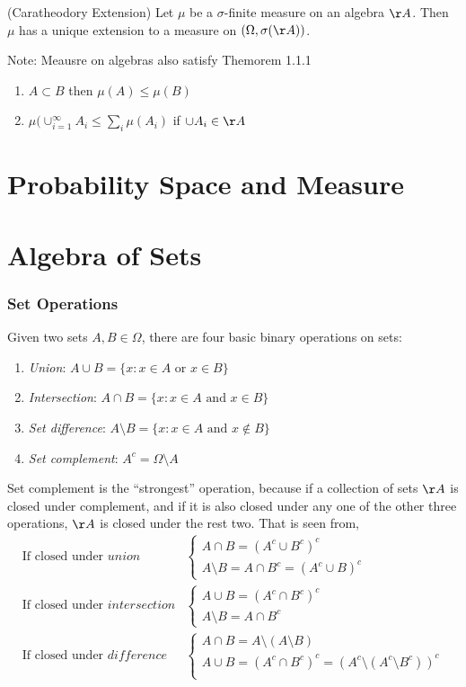 \begin{thm}
	(Caratheodory Extension) Let $\mu$ be a $\sigma$-finite measure on an algebra $\AA$. Then $\mu$ has a unique extension to a measure on $(\Omega, \sigma(\AA))$.
\end{thm}

Note: Meausre on algebras also satisfy Themorem 1.1.1
\begin{enumerate}
	\item $A \subset B$ then $\mu(A) \le \mu(B)$
	\item $\mu(\cup_{i=1}^\infty A_i \le \sum_i \mu(A_i)$ if $\cup A_i \in \AA$
\end{enumerate}


\section{Probability Space and Measure}

\section{Algebra of Sets}

\subsubsection{Set Operations}
Given two sets $A, B \in \Omega$, there are four basic binary operations on sets:
\begin{enumerate}
	\item {\em{Union}}: $A \cup B = \{x: x \in A \mbox{ or } x \in B\}$
	\item {\em{Intersection}}: $A \cap B = \{x: x \in A \mbox{ and } x \in B\}$
	\item {\em{Set difference}}: $A \setminus B = \{x: x \in A \mbox{ and } x \notin B\}$
	\item {\em{Set complement}}: $A^c = \Omega \setminus A$
\end{enumerate}

Set complement is the ``strongest'' operation, because if a collection of sets $\AA$ is closed under complement, and if it is also closed under any one of the other three operations, $\AA$ is closed under the rest two. That is seen from,
\begin{align}
	\mbox{If closed under } union &
	\begin{cases}
		A \cap B = (A^c \cup B^c)^c\\
		A \setminus B = A \cap B^c = (A^c \cup B)^c
	\end{cases}	
	\\
	\mbox{If closed under } intersection &
	\begin{cases}
		A \cup B = (A^c \cap B^c)^c\\		
		A \setminus B = A \cap B^c
	\end{cases}
	\\
	\mbox{If closed under } difference &
	\begin{cases}
		A \cap B = A \setminus (A \setminus B)\\
		A \cup B = (A^c \cap B^c)^c = (A^c \setminus (A^c \setminus B^c))^c\\
	\end{cases}		
\end{align}

